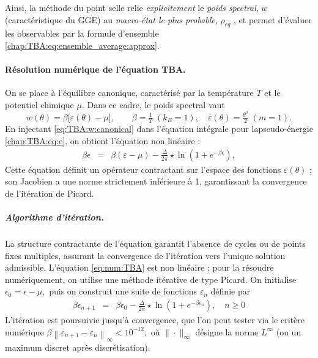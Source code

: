 \medskip
Ainsi, la méthode du point selle relie \emph{explicitement} le {\em poids spectral}, $w$  (caractéristique du GGE) au \emph{macro-état le plus probable}, $\rho_{eq}$ , et permet d’évaluer les observables par la formule d’ensemble \eqref{chap:TBA:eq:ensemble_average:approx}.


\paragraph{Résolution numérique de l’équation TBA.}

On se place à l’équilibre canonique, caractérisé par la température \( T \) et le potentiel chimique \( \mu \).  Dans ce cadre, le poids spectral vaut
\begin{equation}
  w(\theta)=\beta\bigl[\varepsilon(\theta)-\mu\bigr],\qquad\beta=\tfrac1T\; (k_B = 1 ),\quad\varepsilon(\theta)=\tfrac{\theta^{2}}{2}\;(m=1).\label{eq:TBA:w:canonical}
\end{equation}
En injectant \eqref{eq:TBA:w:canonical} dans l’équation intégrale pour lapseudo-énergie \eqref{chap:TBA:eq:e}, on obtient l’équation non linéaire :
\begin{eqnarray*}
	\beta \epsilon & = & \beta (\varepsilon - \mu)  -  \frac{\Delta}{2\pi} \star \ln \left( 1 + e^{-\beta \epsilon} \right) ,\label{eq:num:TBA}
\end{eqnarray*}
Cette équation définit un opérateur contractant sur l’espace des fonctions
\( \varepsilon(\theta) \) ; son Jacobien a une norme strictement
inférieure à 1, garantissant la convergence de l’itération de Picard.

\medskip
\subparagraph{Algorithme d’itération.}  
La structure contractante de l’équation garantit l’absence de cycles ou de points fixes multiples, assurant la convergence de l’itération vers l’unique solution admissible.
L’équation \eqref{eq:num:TBA} est non linéaire ; pour la résoudre numériquement, on utilise une méthode itérative de type Picard. On initialise
\(
  \epsilon_0 = \epsilon - \mu,
\)
puis on construit une suite de fonctions \(\varepsilon_n\) définie par
\begin{eqnarray*}
	\beta \epsilon_{n+1} & = & \beta \epsilon_0 -   \frac{\Delta}{2\pi} \star \ln \left( 1 + e^{-\beta \epsilon_n} \right) ,\quad n\ge0
\end{eqnarray*}
L’itération est poursuivie jusqu’à convergence, que l’on peut tester via le critère numérique
\(
  \beta \left\| \varepsilon_{n+1} - \varepsilon_n \right\|_\infty < 10^{-12},
\)
où \(\|\cdot\|_\infty\) désigne la norme \(L^\infty\) (ou un maximum discret après discrétisation).


